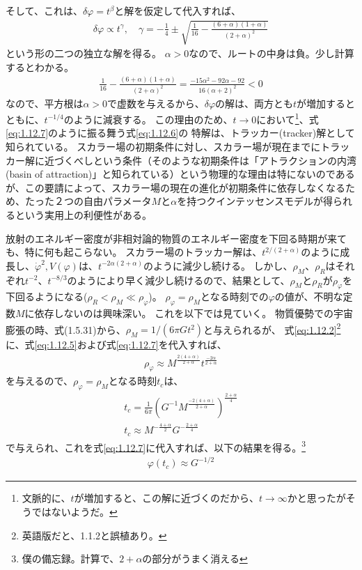 \documentclass[11pt]{ltjsarticle}
\theoremstyle{plain}
\theoremstyle{break}
\begin{document}
そして、これは、$\delta\varphi = t^{\beta}$と解を仮定して代入すれば、
\begin{align}
  \delta \varphi \propto t^{\gamma}, \quad \gamma=-\frac{1}{4} \pm \sqrt{\frac{1}{16}-\frac{(6+\alpha)(1+\alpha)}{(2+\alpha)^{2}}}
\end{align}%
という形の二つの独立な解を得る。
$\alpha>0$なので、ルートの中身は負。少し計算するとわかる。
\begin{align}
  \frac{1}{16}-\frac{(6+\alpha)(1+\alpha)}{(2+\alpha)^{2}} = \frac{-15\alpha^2 - 92 \alpha -92}{16(\alpha+2)^2} < 0
\end{align}%
なので、平方根は$\alpha>0$で虚数を与えるから、$\delta \varphi$の解は、両方とも$t$が増加するとともに、$t^{-1/4}$のように減衰する。
この理由のため、$t\to0$において\footnote{文脈的に、$t$が増加すると、この解に近づくのだから、$t \to \infty$かと思ったがそうではないようだ。}、式\eqref{eq:1.12.7}のように振る舞う式\eqref{eq:1.12.6}の
特解は、トラッカー(tracker)解として知られている。
スカラー場の初期条件に対し、スカラー場が現在までにトラッカー解に近づくべしという条件（そのような初期条件は「アトラクションの内湾(basin of attraction)」と知られている）という物理的な理由は特にないのであるが、この要請によって、スカラー場の現在の進化が初期条件に依存しなくなるため、たった２つの自由パラメータ$M$と$\alpha$を持つクインテッセンスモデルが得られるという実用上の利便性がある。

放射のエネルギー密度が非相対論的物質のエネルギー密度を下回る時期が来ても、特に何も起こらない。
スカラー場のトラッカー解は、$t^{2/(2+\alpha)}$のように成長し、$\dot{\varphi}^2,V(\varphi)$は、$t^{-2\alpha(2+\alpha)}$のように減少し続ける。
しかし、$\rho_{M}$、$\rho_{R}$はそれぞれ$t^{-2}$、$t^{-8/3}$のようにより早く減少し続けるので、結果として、$\rho_{M}$と$\rho_{R}$が$\rho_{\varphi}$を下回るようになる($\rho_{R}<\rho_{M}\ll \rho_{\varphi}$)。
$\rho_{\varphi}=\rho_{M}$となる時刻での$\varphi$の値が、不明な定数$M$に依存しないのは興味深い。
これを以下では見ていく。
物質優勢での宇宙膨張の時、式(1.5.31)から、$\rho_M = 1/(6\pi G t^2)$と与えられるが、
式\eqref{eq:1.12.2}\footnote{英語版だと、1.1.2と誤植あり。}に、式\eqref{eq:1.12.5}および式\eqref{eq:1.12.7}を代入すれば、%
\begin{align}
  \rho_{\varphi} \approx M^{\frac{2(4+\alpha)}{2+\alpha}} t^{\frac{-2\alpha}{2+\alpha}}
\end{align}%
を与えるので、$\rho_{\varphi} = \rho_{M}$となる時刻$t_c$は、
\begin{align}
  t_c = \frac{1}{6\pi}\left(G^{-1} M^{\frac{-2(4+\alpha)}{2+\alpha}}\right)^{\frac{2+\alpha}{4}}\\
  t_c \approx M^{-\frac{4+\alpha}{2}} G^{-\frac{2+\alpha}{4}}
\end{align}%
で与えられ、これを式\eqref{eq:1.12.7}に代入すれば、以下の結果を得る。\footnote{僕の備忘録。計算で、$2+\alpha$の部分がうまく消える}
\begin{align}
  \varphi(t_c) \approx G^{-1/2}
\end{align}%
\end{document}
